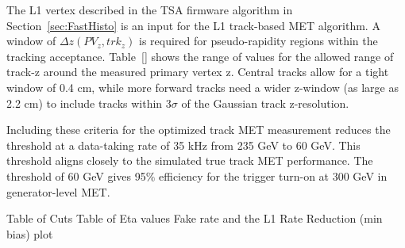 The L1 vertex described in the TSA firmware algorithm in Section~\ref{sec:FastHisto} is an input for the L1 track-based MET algorithm. A window of $\Delta z\left(PV_{z}, trk_{z}\right)$ is required for pseudo-rapidity regions within the tracking acceptance. Table~\ref{} shows the range of values for the allowed range of track-z around the measured primary vertex z. Central tracks allow for a tight window of 0.4 cm, while more forward tracks need a wider z-window (as large as 2.2 cm) to include tracks within $3\sigma$ of the Gaussian track z-resolution.

Including these criteria for the optimized track MET measurement reduces the threshold at a data-taking rate of 35 kHz from 235 GeV to 60 GeV. This threshold aligns closely to the simulated true track MET performance. The threshold of 60 GeV gives 95$\%$ efficiency for the trigger turn-on at 300 GeV in generator-level MET.


Table of Cuts
Table of Eta values
Fake rate and the L1 Rate Reduction (min bias) plot
